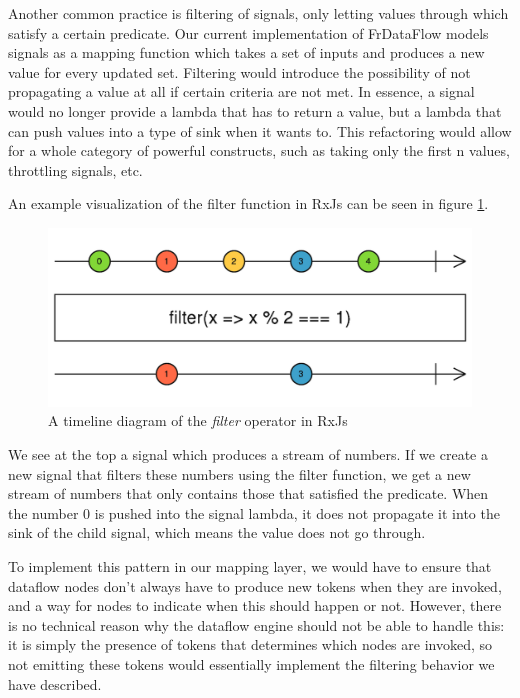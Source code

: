 Another common practice is filtering of signals, only letting values through which satisfy a certain predicate. Our current implementation of FrDataFlow models signals as a mapping function which takes a set of inputs and produces a new value for every updated set. Filtering would introduce the possibility of not propagating a value at all if certain criteria are not met. In essence, a signal would no longer provide a lambda that has to return a value, but a lambda that can push values into a type of sink when it wants to. This refactoring would allow for a whole category of powerful constructs, such as taking only the first n values, throttling signals, etc. 

An example visualization of the filter function in RxJs can be seen in figure  \ref{fig:futurework-filtering-filter}. 

\begin{figure}[h!]
	\includegraphics[width=\textwidth]{images/FutureWork-Filtering-Filter.png}
	\caption{A timeline diagram of the \textit{filter} operator in RxJs}
	\label{fig:futurework-filtering-filter}
\end{figure}

We see at the top a signal which produces a stream of numbers. If we create a new signal that filters these numbers using the filter function, we get a new stream of numbers that only contains those that satisfied the predicate. When the number 0 is pushed into the signal lambda, it does not propagate it into the sink of the child signal, which means the value does not go through. 

To implement this pattern in our mapping layer, we would have to ensure that dataflow nodes don't always have to produce new tokens when they are invoked, and a way for nodes to indicate when this should happen or not. However, there is no technical reason why the dataflow engine should not be able to handle this: it is simply the presence of tokens that determines which nodes are invoked, so not emitting these tokens would essentially implement the filtering behavior we have described.



